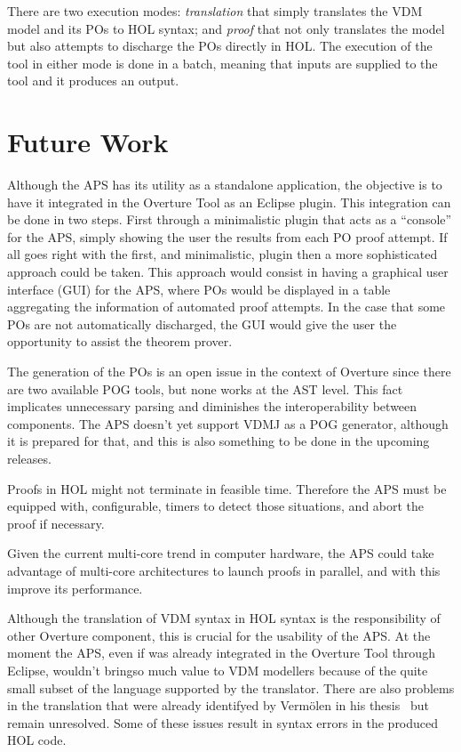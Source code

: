 \documentclass[]{article}
\begin{document}
There are two execution modes: \emph{translation} that simply translates the VDM model and its POs to HOL syntax; and \emph{proof} that not only translates the model but also attempts to discharge the POs directly in HOL.
The execution of the tool in either mode is done in a batch, meaning that inputs are supplied to the tool and it produces an output.

\section{Future Work}
\label{sec:future_work}

Although the APS has its utility as a standalone application, the objective is to have it integrated in the Overture Tool as an Eclipse plugin.
This integration can be done in two steps. 
First through a minimalistic plugin that acts as a ``console'' for the APS, simply showing the user the results from each PO proof attempt.
If all goes right with the first, and minimalistic, plugin then a more sophisticated approach could be taken.
This approach would consist in having a graphical user interface (GUI) for the APS, where POs would be displayed in a table aggregating the information of automated proof attempts.
In the case that some POs are not automatically discharged, the GUI would give the user the opportunity to assist the theorem prover.



The generation of the POs is an open issue in the context of Overture since there are two available POG tools, but none works at the AST level.
This fact implicates unnecessary parsing and diminishes the interoperability between components.
The APS doesn't yet support VDMJ as a POG generator, although it is prepared for that, and this is also something to be done in the upcoming releases.

Proofs in HOL might not terminate in feasible time.
Therefore the APS must be equipped with, configurable, timers to detect those situations, and abort the proof if necessary.

Given the current multi-core trend in computer hardware, the APS could take advantage of multi-core architectures to launch proofs in parallel, and with this improve its performance.

Although the translation of VDM syntax in HOL syntax is the responsibility of other Overture component, this is crucial for the usability of the APS.
At the moment the APS, even if was already integrated in the Overture Tool through Eclipse, wouldn't bringso much value to VDM modellers because of the quite small subset of the language supported by the translator.
There are also problems in the translation that were already identifyed by Verm\"olen in his thesis~\cite[OpenIssues]{Sander} but remain unresolved.
Some of these issues result in syntax errors in the produced HOL code.
\end{document}
